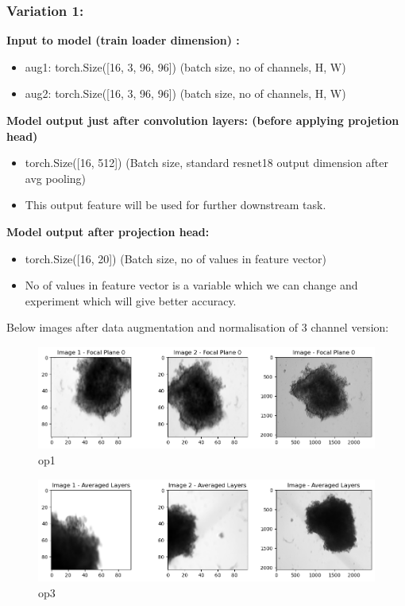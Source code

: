 \documentclass[a4paper,12pt]{report}
\begin{document}
\subsubsection{Variation 1:}
\textbf{Input to model (train loader dimension) :} 

\begin{itemize}
  \item aug1: torch.Size([16, 3, 96, 96])        (batch size, no of channels, H, W)
  \item aug2: torch.Size([16, 3, 96, 96])        (batch size, no of channels, H, W) \vspace{1em}
\end{itemize} \vspace{1em}
\textbf{Model output just after convolution layers: (before applying projetion head)} 
\begin{itemize}
  \item torch.Size([16, 512]) (Batch size, standard resnet18 output dimension after avg pooling)   
  \item This output feature will be used for further downstream task.  \vspace{1em}
\end{itemize}

\textbf{Model output after projection head:}
\begin{itemize}
  \item torch.Size([16, 20])  (Batch size, no of values in feature vector)  
  \item No of values in feature vector is a variable which we can change and experiment which will give better accuracy.
\end{itemize}
Below images after data augmentation and normalisation of 3 channel version:

  \begin{figure}[H]
    \centering
    \includegraphics[width=0.9\linewidth]{figures/op1.png} %
    \caption{op1}
    \label{fig:out_2}
  \end{figure}

  \begin{figure}[H]
    \centering
    \includegraphics[width=0.9\linewidth]{figures/output3.png} %
    \caption{op3}
    \label{fig:output3}
  \end{figure}
\end{document}
